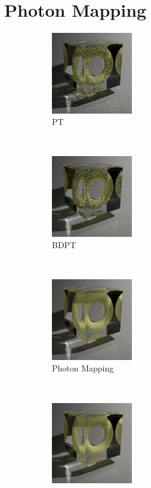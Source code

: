 \documentclass[]{book}
\begin{document}

\chapter{Photon Mapping}
\label{chap:photon_mapping}
\begin{figure}[!ht]
	\begin{subfigure}{0.24\textwidth}
		\includegraphics[height=1.4in]{img/PM-0-PT.png}
		\caption{PT}
	\end{subfigure}%
	~
	\begin{subfigure}{0.24\textwidth}
		\includegraphics[height=1.4in]{img/PM-0-BDPT.png}
		\caption{BDPT}
	\end{subfigure}%
	~
	\begin{subfigure}{0.24\textwidth}
		\includegraphics[height=1.4in]{img/PM-0-PM.png}
		\caption{Photon Mapping}
	\end{subfigure}%
	~
	\begin{subfigure}{0.24\textwidth}
		\includegraphics[height=1.4in]{img/PM-0-reference.png}

\end{subfigure}
\end{figure}
\end{document}
